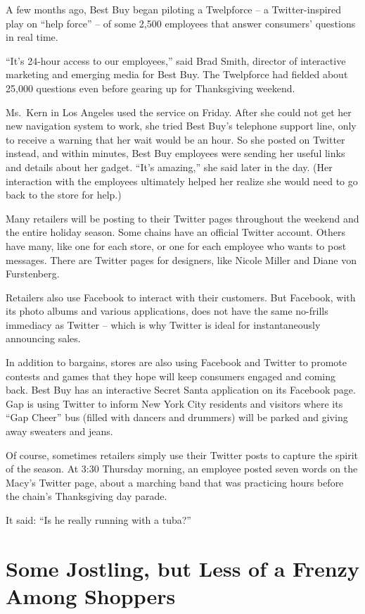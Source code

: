 ﻿\documentclass[12pt]{article}
\begin{document}
A few months ago, Best Buy began piloting a Twelpforce -- a Twitter-inspired play on ``help force''
-- of some 2,500 employees that answer consumers' questions in real time.

``It's 24-hour access to our employees,'' said Brad Smith, director of interactive marketing and
emerging media for Best Buy. The Twelpforce had fielded about 25,000 questions even before gearing
up for Thanksgiving weekend.

Ms.~Kern in Los Angeles used the service on Friday. After she could not get her new navigation
system to work, she tried Best Buy's telephone support line, only to receive a warning that her wait
would be an hour. So she posted on Twitter instead, and within minutes, Best Buy employees were
sending her useful links and details about her gadget. ``It's amazing,'' she said later in the day.
(Her interaction with the employees ultimately helped her realize she would need to go back to the
store for help.)

Many retailers will be posting to their Twitter pages throughout the weekend and the entire holiday
season. Some chains have an official Twitter account. Others have many, like one for each store, or
one for each employee who wants to post messages. There are Twitter pages for designers, like Nicole
Miller and Diane von Furstenberg.

Retailers also use Facebook to interact with their customers. But Facebook, with its photo albums
and various applications, does not have the same no-frills immediacy as Twitter -- which is why
Twitter is ideal for instantaneously announcing sales.

In addition to bargains, stores are also using Facebook and Twitter to promote contests and games
that they hope will keep consumers engaged and coming back. Best Buy has an interactive Secret Santa
application on its Facebook page. Gap is using Twitter to inform New York City residents and
visitors where its ``Gap Cheer'' bus (filled with dancers and drummers) will be parked and giving
away sweaters and jeans.

Of course, sometimes retailers simply use their Twitter posts to capture the spirit of the season.
At 3:30 Thursday morning, an employee posted seven words on the Macy's Twitter page, about a
marching band that was practicing hours before the chain's Thanksgiving day parade.

It said: ``Is he really running with a tuba?''

\section{Some Jostling, but Less of a Frenzy Among Shoppers}
\end{document}
